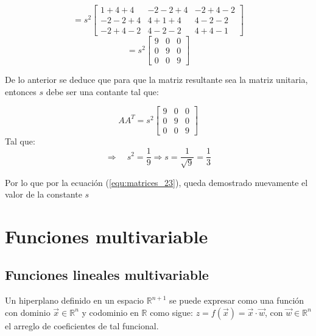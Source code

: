 \documentclass{article}
\begin{document}
\begin{enumerate}
\[
= s^2\begin{bmatrix}
1+4+4 & -2-2+4 & -2+4-2 \\
-2-2+4 & 4+1+4 & 4-2-2 \\
-2+4-2 & 4-2-2 & 4+4-1
\end{bmatrix}
\]
\[
= s^2\begin{bmatrix}
9 & 0 & 0 \\
0 & 9 & 0 \\
0 & 0 & 9
\end{bmatrix} 
\]

De lo anterior se deduce que  para que la matriz resultante sea la matriz unitaria, entonces $s$ debe ser una contante tal que: 

\begin{equation}
\label{equ:matrices_22}
AA^T= s^2\begin{bmatrix}
9 & 0 & 0 \\
0 & 9 & 0 \\
0 & 0 & 9
\end{bmatrix} 
\end{equation}
Tal que: 
\begin{equation}
\label{equ:matrices_23}
\Rightarrow \quad s^2 = \frac{1}{9} \Rightarrow s = \frac{1}{\sqrt{9}} = \frac{1}{3}
\end{equation}

Por lo que por la ecuación (\ref{equ:matrices_23}), queda demostrado nuevamente el valor de la constante $s$

\end{enumerate}

\section{Funciones multivariable}

\subsection{Funciones lineales multivariable}

Un hiperplano definido en un espacio $\mathbb{R}^{n+1}$ se puede expresar como una función con dominio $\overrightarrow{x}\in\mathbb{R}^n$ y codominio en $\mathbb{R}$ como sigue: $z=f(\overrightarrow{x})=\overrightarrow{x}\cdot\overrightarrow{w}$, con $\overrightarrow{w}\in\mathbb{R}^n$ el arreglo de coeficientes de tal funcional.
\end{document}
